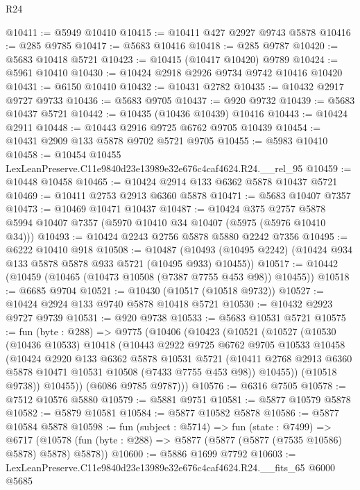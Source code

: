 \begin{lexlean}{R24}
\begin{coremodule}
@10411 := @5949 @10410
@10415 := @10411 @427 @2927 @9743 @5878
@10416 := @285 @9785
@10417 := @5683 @10416
@10418 := @285 @9787
@10420 := @5683 @10418 @5721
@10423 := @10415 (@10417 @10420) @9789
@10424 := @5961 @10410
@10430 := @10424 @2918 @2926 @9734 @9742 @10416 @10420
@10431 := @6150 @10410
@10432 := @10431 @2782
@10435 := @10432 @2917 @9727 @9733
@10436 := @5683 @9705
@10437 := @920 @9732
@10439 := @5683 @10437 @5721
@10442 := @10435 (@10436 @10439) @10416
@10443 := @10424 @2911
@10448 := @10443 @2916 @9725 @6762 @9705 @10439
@10454 := @10431 @2909 @133 @5878 @9702 @5721 @9705
@10455 := @5983 @10410
@10458 := @10454 @10455 LexLeanPreserve.C11e9840d23e13989e32e676c4caf4624.R24.__rel_95
@10459 := @10448 @10458
@10465 := @10424 @2914 @133 @6362 @5878 @10437 @5721
@10469 := @10411 @2753 @2913 @6360 @5878
@10471 := @5683 @10407 @7357
@10473 := @10469 @10471 @10437
@10487 := @10424
    @375
    @2757
    @5878
    @5994
    @10407
    @7357
    (@5970 @10410 @34 @10407 (@5975 (@5976 @10410 @34)))
@10493 := @10424 @2243 @2756 @5878 @5880 @2242 @7356
@10495 := @6222 @10410 @918
@10508 := @10487
    (@10493 (@10495 @2242) (@10424 @934 @133 @5878 @5878 @933 @5721 (@10495 @933) @10455))
@10517 := @10442 (@10459 (@10465 (@10473 @10508 (@7387 @7755 @453 @98)) @10455))
@10518 := @6685 @9704
@10521 := @10430 (@10517 (@10518 @9732))
@10527 := @10424 @2924 @133 @9740 @5878 @10418 @5721
@10530 := @10432 @2923 @9727 @9739
@10531 := @920 @9738
@10533 := @5683 @10531 @5721
@10575 := fun (byte : @288) =>
  @9775
    (@10406
      (@10423
        (@10521
          (@10527
            (@10530
              (@10436 @10533)
              @10418
              (@10443
                @2922
                @9725
                @6762
                @9705
                @10533
                @10458
                (@10424
                  @2920
                  @133
                  @6362
                  @5878
                  @10531
                  @5721
                  (@10411 @2768 @2913 @6360 @5878 @10471 @10531 @10508 (@7433 @7755 @453 @98))
                  @10455))
              (@10518 @9738))
            @10455))
        (@6086 @9785 @9787)))
@10576 := @6316 @7505
@10578 := @7512 @10576 @5880
@10579 := @5881 @9751
@10581 := @5877 @10579 @5878
@10582 := @5879 @10581
@10584 := @5877 @10582 @5878
@10586 := @5877 @10584 @5878
@10598 := fun (subject : @5714) =>
  fun (state : @7499) =>
  @6717 (@10578 (fun (byte : @288) => @5877 (@5877 (@5877 (@7535 @10586) @5878) @5878) @5878))
@10600 := @5886 @1699 @7792
@10603 := LexLeanPreserve.C11e9840d23e13989e32e676c4caf4624.R24.__fits_65 @6000 @5685

\end{coremodule}
\end{lexlean}
